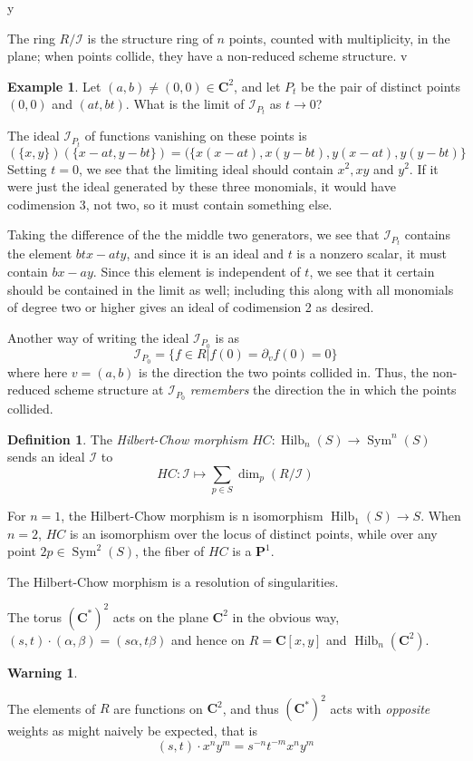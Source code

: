y\documentclass{amsart}[12pt]
\theoremstyle{definition}
\newtheorem{example}[dummy]{Example}
\newtheorem{definition}[dummy]{Definition}
\newtheorem{warning}[dummy]{Warning}
\newcommand{\C}{\mathbf{C}}
\newcommand{\proj}{\mathbf{P}}
\DeclareMathOperator{\Hilb}{Hilb}
\DeclareMathOperator{\Sym}{Sym}
\begin{document}
The ring $R/\mathcal{I}$ is the structure ring of $n$ points, counted with multiplicity, in the plane; when points collide, they have a non-reduced scheme structure.  
v
\begin{example}
Let $(a,b)\neq (0,0)\in\C^2$, and let $P_t$ be the pair of distinct points $(0,0)$ and $(at,bt)$.  What is the limit of $\mathcal{I}_{P_t}$ as $t\to 0$?


The ideal $\mathcal{I}_{P_t}$ of functions vanishing on these points is 
$$(\{x,y\})(\{x-at,y-bt\})=(\{x(x-at),x(y-bt), y(x-at), y(y-bt)\}$$
Setting $t=0$, we see that the limiting ideal should contain $x^2, xy$ and $y^2$.  If it were just the ideal generated by these three monomials, it would have codimension 3, not two, so it must contain something else.

Taking the difference of the the middle two generators, we see that $\mathcal{I}_{P_t}$ contains the element $btx-aty$, and since it is an ideal and $t$ is a nonzero scalar, it must contain $bx-ay$.  Since this element is independent of $t$, we see that it certain should be contained in the limit as well; including this along with all monomials of degree two or higher gives an ideal of codimension 2 as desired.

Another way of writing the ideal $\mathcal{I}_{P_0}$ is as 
$$\mathcal{I}_{P_0}=\{f\in R| f(0)=\partial_vf(0)=0\}$$
where here $v=(a,b)$ is the direction the two points collided in.  Thus, the non-reduced scheme structure at $\mathcal{I}_{P_0}$ \emph{remembers} the direction the in which the points collided. 
\end{example}

\begin{definition}
The \emph{Hilbert-Chow morphism} $HC:\Hilb_n(S)\to\Sym^n(S)$ sends an ideal $\mathcal{I}$ to 
$$HC:\mathcal{I}\mapsto \sum_{p\in S} \dim_p (R/\mathcal{I})$$
\end{definition}


For $n=1$, the Hilbert-Chow morphism is n isomorphism $\Hilb_1(S)\to S$.  When $n=2$, $HC$ is an isomorphism over the locus of distinct points, while over any point $2p\in\Sym^2(S)$, the fiber of $HC$ is a $\proj^1$.

The Hilbert-Chow morphism is a resolution of singularities.


The torus $(\C^*)^2$ acts on the plane $\C^2$ in the obvious way, $(s,t)\cdot (\alpha,\beta)=(s\alpha,t\beta)$ and hence on $R=\C[x,y]$ and $\Hilb_n(\C^2)$.  

\begin{warning} \label{warning:action-sign}

 The elements of $R$ are functions on $\C^2$, and thus $(\C^*)^2$ acts with \emph{opposite} weights as might naively be expected, that is 
$$(s,t)\cdot x^ny^m=s^{-n}t^{-m}x^ny^m$$

\end{warning}
\end{document}
